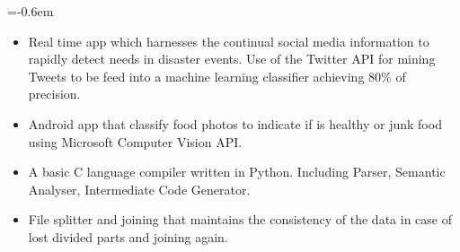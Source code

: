 \documentclass[]{cv-format}
\begin{document}
	\begin{itemize}
		\parskip=-0.6em 
			\begin{itemize}[label=\textbullet]
				\itemsep0em
				\item Real time app which harnesses the continual social media information to rapidly detect needs in disaster events. Use of the Twitter API for mining Tweets to be feed into a machine learning classifier achieving 80\% of precision.
			\end{itemize}
		\vspace{\separationBetweenItems}
		
		\begin{itemize}[label=\textbullet]
			\itemsep0em
			\item Android app that classify food photos to indicate if is healthy or junk food using Microsoft Computer Vision API.
		\end{itemize}
		
		\vspace{\separationBetweenItems}	
		\begin{itemize}[label=\textbullet]
			\itemsep0em
			\item A basic C language compiler written in Python. Including Parser, Semantic Analyser, Intermediate Code Generator.
		\end{itemize}
		
		\vspace{\separationBetweenItems}
		\begin{itemize}[label=\textbullet]
			\itemsep0em
			\item File splitter and joining that maintains the consistency of the data in case of lost divided parts and joining again.
		\end{itemize}
	\end{itemize}
	
\end{document}
